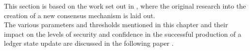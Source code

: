 This section is based on the work set out in \cite{catalystresearch}, where the original research into the creation of a new consensus mechanism is laid out. \\

The various parameters and thresholds mentioned in this chapter and their impact on the levels of security and confidence in the successful production of a ledger state update are discussed in the following paper \cite{catalystresearch2}.
